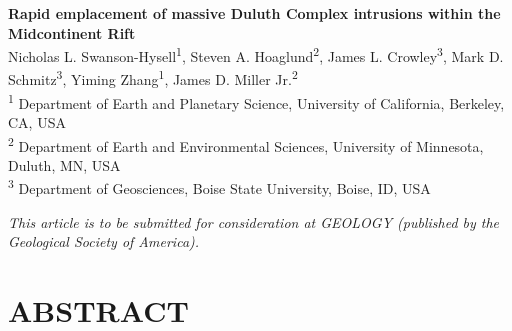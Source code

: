 \documentclass[11pt,letterpaper]{article}
\begin{document}
\begin{flushleft}
{\Large \textbf{Rapid emplacement of massive Duluth Complex intrusions within the Midcontinent Rift}}
\\
Nicholas L. Swanson-Hysell\textsuperscript{1}, Steven A. Hoaglund\textsuperscript{2}, James L. Crowley\textsuperscript{3}, Mark D. Schmitz\textsuperscript{3}, Yiming Zhang\textsuperscript{1}, James D. Miller Jr.\textsuperscript{2}
\\
\bigskip
\textsuperscript{1} Department of Earth and Planetary Science, University of California, Berkeley, CA, USA\\
\textsuperscript{2} Department of Earth and Environmental Sciences, University of Minnesota, Duluth, MN, USA \\
\textsuperscript{3} Department of Geosciences, Boise State University, Boise, ID, USA
\bigskip
\end{flushleft}

\noindent\textit{This article is to be submitted for consideration at GEOLOGY (published by the Geological Society of America).}

\linenumbers

\section*{ABSTRACT}
\end{document}
